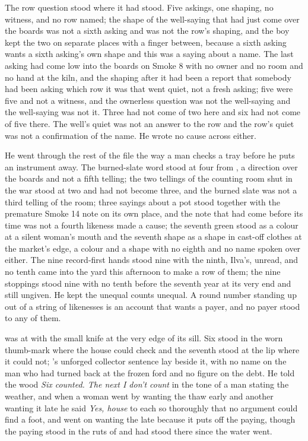 \scenebreak

The row question stood where it had stood. Five askings, one shaping, no witness, and no row named; the shape of the well-saying that had just come over the boards was not a sixth asking and was not the row's shaping, and the boy kept the two on separate places with a finger between, because a sixth asking wants a sixth asking's own shape and this was a saying about a name. The last asking had come low into the boards on Smoke 8 with no owner and no room and no hand at the kiln, and the shaping after it had been a report that somebody had been asking which row it was that went quiet, not a fresh asking; five were five and not a witness, and the ownerless question was not the well-saying and the well-saying was not it. Three had not come of two here and six had not come of five there. The well's quiet was not an answer to the row and the row's quiet was not a confirmation of the name. He wrote no cause across either.

He went through the rest of the file the way a man checks a tray before he puts an instrument away. The burned-slate word stood at four from , a direction over the boards and not a fifth telling; the two tellings of the counting room shut in the war stood at two and had not become three, and the burned slate was not a third telling of the room; three sayings about a pot stood together with the premature Smoke 14 note on its own place, and the note that had come before its time was not a fourth likeness made a cause; the seventh green stood as a colour at a silent woman's mouth and the seventh shape as a shape in cast-off clothes at the market's edge, a colour and a shape with no eighth and no name spoken over either. The nine record-first hands stood nine with the ninth, Ilva's, unread, and no tenth came into the yard this afternoon to make a row of them; the nine stoppings stood nine with no tenth before the seventh year at its very end and still ungiven. He kept the unequal counts unequal. A round number standing up out of a string of likenesses is an account that wants a payer, and no payer stood to any of them.

\scenebreak

 was at  with the small knife at the very edge of its sill. Six stood in the worn thumb-mark where the house could check and the seventh stood at the lip where it could not; 's unforged collector sentence lay beside it, with no name on the man who had turned back at the frozen ford and no figure on the debt. He told the wood \emph{Six counted. The next I don't count} in the tone of a man stating the weather, and when a woman went by wanting the thaw early and another wanting it late he said \emph{Yes, house} to each so thoroughly that no argument could find a foot, and went on wanting the late because it puts off the paying, though the paying stood in the ruts of  and had stood there since the water went.

